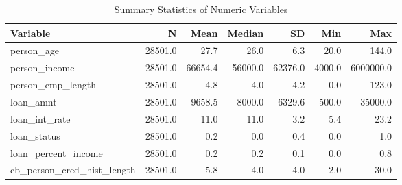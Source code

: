 \begin{table}[H]\centering
\caption{Summary Statistics of Numeric Variables}
\label{Table 2:summary_stats}
\begin{tabular}{lrrrrrr}
\toprule
Variable & N & Mean & Median & SD & Min & Max \\
\midrule
person_age & 28501.0 & 27.7 & 26.0 & 6.3 & 20.0 & 144.0 \\
person_income & 28501.0 & 66654.4 & 56000.0 & 62376.0 & 4000.0 & 6000000.0 \\
person_emp_length & 28501.0 & 4.8 & 4.0 & 4.2 & 0.0 & 123.0 \\
loan_amnt & 28501.0 & 9658.5 & 8000.0 & 6329.6 & 500.0 & 35000.0 \\
loan_int_rate & 28501.0 & 11.0 & 11.0 & 3.2 & 5.4 & 23.2 \\
loan_status & 28501.0 & 0.2 & 0.0 & 0.4 & 0.0 & 1.0 \\
loan_percent_income & 28501.0 & 0.2 & 0.2 & 0.1 & 0.0 & 0.8 \\
cb_person_cred_hist_length & 28501.0 & 5.8 & 4.0 & 4.0 & 2.0 & 30.0 \\
\bottomrule
\end{tabular}
\end{table}
